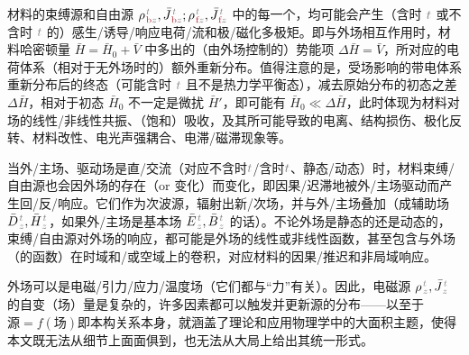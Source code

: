 材料的束缚源和自由源 ${\rho}^{\;\!\mathcolor{gray}{t}}_{\;\!\textcolor{Maroon}{\text{b}}\mathcolor{gray}{z}}, \bar{J}^{\;\!\mathcolor{gray}{t}}_{\;\!\textcolor{Maroon}{\text{b}}\mathcolor{gray}{z}};{\rho}^{\;\!\mathcolor{gray}{t}}_{\;\!\textcolor{Maroon}{\text{f}}\mathcolor{gray}{z}}, \bar{J}^{\;\!\mathcolor{gray}{t}}_{\;\!\textcolor{Maroon}{\text{f}}\mathcolor{gray}{z}}$ 中的每一个，均可能会产生（含时 $\mathcolor{gray}{t}$ 或不含时 $\mathcolor{gray}{t}$ 的）感生/诱导/响应电荷/流\cite{markelExternalInducedFree2018,raabMultipoleTheoryElectromagnetism2004,tsukermanPolarizationArbitraryCharge2021a}和极/磁化多极矩。即与外场相互作用时，材料哈密顿量 $\bar{H} = \bar{H}_0 + \bar{V}$ 中多出的（由外场控制的）势能项 $\Delta \bar{H} = \bar{V}$\cite{boydNonlinearOptics2019,raabMultipoleTheoryElectromagnetism2004}，所对应的电荷体系（相对于无外场时的）额外重新分布。值得注意的是，受场影响的带电体系重新分布后的终态（可能含时 $\mathcolor{gray}{t}$ 且不是热力学平衡态），减去原始分布的初态之差 $\Delta \bar{H}$，相对于初态 $\bar{H}_0$ 不一定是微扰 $\bar{H}'$\cite{boydNonlinearOptics2019}，即可能有 $\bar{H}_0 \ll \Delta \bar{H}$，此时体现为材料对场的线性/非线性共振、（饱和）吸收，及其所可能导致的电离\cite{boydNonlinearOptics2019}、结构损伤、极化反转、材料改性\cite{xuFemtosecondLaserWriting2022,weiExperimentalDemonstrationThreedimensional2018,xuThreedimensionalNonlinearPhotonic2018,keren-zurNewDimensionNonlinear2018}、电光声强耦合、电滞/磁滞现象等。

当外/主场、驱动场是直/交流（对应不含时$\mathcolor{gray}{t}$/含时$\mathcolor{gray}{t}$、静态/动态）时，材料束缚/自由源也会因外场的存在（or 变化）而变化，即因果/迟滞地被外/主场驱动而产生回/反/响应。它们作为次波源，辐射出新/次场，并与外/主场叠加（成辅助场 $\bar{D}^{\;\!\mathcolor{gray}{t}}_{\;\!\mathcolor{gray}{z}}, \bar{H}^{\;\!\mathcolor{gray}{t}}_{\;\!\mathcolor{gray}{z}}$，如果外/主场是基本场 $\bar{E}^{\;\!\mathcolor{gray}{t}}_{\;\!\mathcolor{gray}{z}}, \bar{B}^{\;\!\mathcolor{gray}{t}}_{\;\!\mathcolor{gray}{z}}$ 的话）。不论外场是静态的还是动态的，束缚/自由源对外场的响应，都可能是外场的线性或非线性函数，甚至包含与外场（的函数）在时域和/或空域上的卷积，对应材料的因果/推迟和非局域响应。

外场可以是电磁/引力/应力/温度场（它们都与“力”有关）。因此，电磁源 ${\rho}^{\;\!\mathcolor{gray}{t}}_{\;\!\mathcolor{gray}{z}}, \bar{J}^{\;\!\mathcolor{gray}{t}}_{\;\!\mathcolor{gray}{z}}$ 的自变（场）量是复杂的，许多因素都可以触发并更新源的分布——以至于$\text{源} = f(\text{场})$即本构关系本身，就涵盖了理论和应用物理学中的大面积主题，使得本文既无法从细节上面面俱到，也无法从大局上给出其统一形式。

